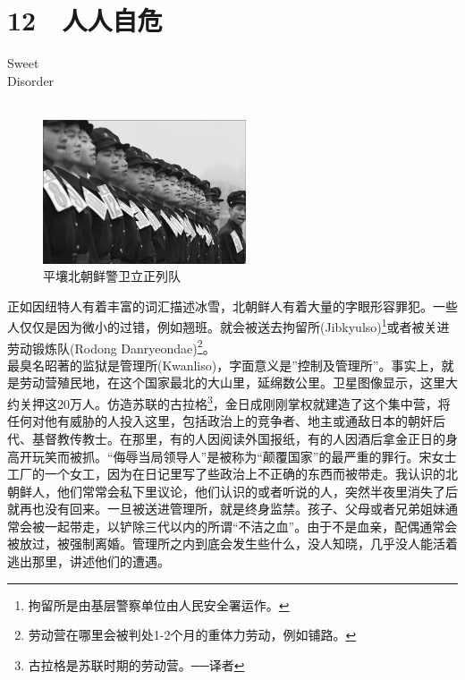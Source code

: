 \fancyhead[RO]{{\tiny{\textcolor{Gray}{\FA \ }}}\thepage}
\fancyhead[LE]{{\tiny{\textcolor{Gray}{\FA \ }}}\thepage}
\fancyfoot[LE,RO]{}
\fancyfoot[LO,CE]{}
\fancyfoot[CO,RE]{}
\chapter*{12 {\FA } 人人自危}
\vspace{5mm}
\begin{flushright}
	\textcolor{PinYinColor}{\EN \huge{Sweet\\
	Disorder\\
	\ \\}}
\end{flushright}
\begin{figure}[!htbp]
	\centering
	\includegraphics[width=6cm]{./Chapters/Images/12.jpg}
	\caption*{平壤北朝鲜警卫立正列队}
\end{figure}


正如因纽特人有着丰富的词汇描述冰雪，北朝鲜人有着大量的字眼形容罪犯。一些人仅仅是因为微小的过错，例如翘班。就会被送去拘留所(Jibkyulso)\footnote{拘留所是由基层警察单位由人民安全署运作。}或者被关进劳动锻炼队(Rodong Danryeondae)\footnote{劳动营在哪里会被判处1-2个月的重体力劳动，例如铺路。}。\\

最臭名昭著的监狱是管理所(Kwanliso)，字面意义是”控制及管理所”。事实上，就是劳动营殖民地，在这个国家最北的大山里，延绵数公里。卫星图像显示，这里大约关押这20万人。仿造苏联的古拉格\footnote{古拉格是苏联时期的劳动营。──译者}，金日成刚刚掌权就建造了这个集中营，将任何对他有威胁的人投入这里，包括政治上的竞争者、地主或通敌日本的朝奸后代、基督教传教士。在那里，有的人因阅读外国报纸，有的人因酒后拿金正日的身高开玩笑而被抓。“侮辱当局领导人”是被称为“颠覆国家”的最严重的罪行。宋女士工厂的一个女工，因为在日记里写了些政治上不正确的东西而被带走。我认识的北朝鲜人，他们常常会私下里议论，他们认识的或者听说的人，突然半夜里消失了后就再也没有回来。一旦被送进管理所，就是终身监禁。孩子、父母或者兄弟姐妹通常会被一起带走，以铲除三代以内的所谓“不洁之血”。由于不是血亲，配偶通常会被放过，被强制离婚。管理所之内到底会发生些什么，没人知晓，几乎没人能活着逃出那里，讲述他们的遭遇。\\

